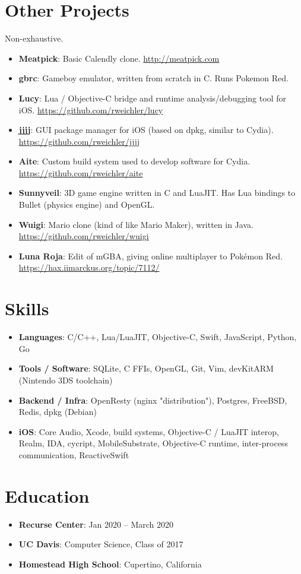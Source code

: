 \documentclass[letterpaper,11pt]{article}
\newcommand{\resumeItem}[2]{
  \item\small{
    \textbf{#1}{: #2 \vspace{-2.5pt}}
  }
}
\newcommand{\resumeSubItem}[2]{\resumeItem{#1}{#2}\vspace{-4.5pt}}
\newcommand{\resumeSubHeadingListStart}{\begin{itemize}[leftmargin=*]}
\newcommand{\resumeSubHeadingListEnd}{\end{itemize}}
\begin{document}
\section{Other Projects}
    Non-exhaustive.\vspace{-2pt}
  \resumeSubHeadingListStart
    \resumeSubItem{Meatpick}
      {Basic Calendly clone. \href{http://meatpick.com}{http://meatpick.com}}
    \resumeSubItem{gbrc}
      {Gameboy emulator, written from scratch in C. Runs Pokemon Red.}
    \resumeSubItem{Lucy}
      {Lua / Objective-C bridge and runtime analysis/debugging tool for iOS. \href{https://github.com/rweichler/lucy}{https://github.com/rweichler/lucy}}
    \resumeSubItem{jjjj}
      {GUI package manager for iOS (based on dpkg, similar to Cydia).  \href{https://github.com/rweichler/jjjj}{https://github.com/rweichler/jjjj}}
    \resumeSubItem{Aite}
      {Custom build system used to develop software for Cydia. \href{https://github.com/rweichler/aite}{https://github.com/rweichler/aite}}
    \resumeSubItem{Sunnyveil}
      {3D game engine written in C and LuaJIT. Has Lua bindings to Bullet (physics engine) and OpenGL.}
    \resumeSubItem{Wuigi}
      {Mario clone (kind of like Mario Maker), written in Java. \href{https://github.com/rweichler/wuigi}{https://github.com/rweichler/wuigi}}
    \resumeSubItem{Luna Roja}
      {Edit of mGBA, giving online multiplayer to Pok\'emon Red.  \href{https://hax.iimarckus.org/topic/7112/}{https://hax.iimarckus.org/topic/7112/}}
  \resumeSubHeadingListEnd

  
\section{Skills}
  \resumeSubHeadingListStart
        \resumeSubItem{Languages}
            {C/C++, Lua/LuaJIT, Objective-C, Swift, JavaScript, Python, Go}
        \resumeSubItem{Tools / Software}
            {SQLite, C FFIs, OpenGL, Git, Vim, devKitARM (Nintendo 3DS toolchain)}
        \resumeSubItem{Backend / Infra}
            {OpenResty (nginx "distribution"), Postgres, FreeBSD, Redis, dpkg (Debian)}
        \resumeSubItem{iOS}
            {Core Audio, Xcode, build systems, Objective-C / LuaJIT interop, Realm, IDA, cycript, MobileSubstrate, Objective-C runtime, inter-process communication, ReactiveSwift}
  \resumeSubHeadingListEnd


\section{Education}
  \resumeSubHeadingListStart
    \resumeSubItem
      {Recurse Center}{Jan 2020 -- March 2020}
    \resumeSubItem
      {UC Davis}{Computer Science, Class of 2017}
    \resumeSubItem
      {Homestead High School}{Cupertino, California}
  \resumeSubHeadingListEnd
\end{document}
